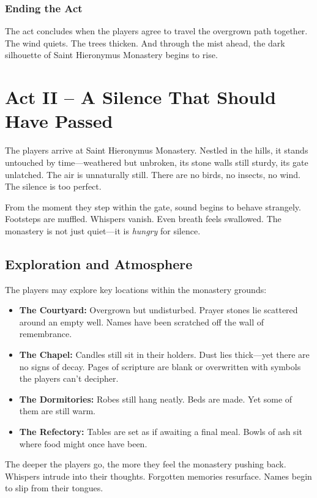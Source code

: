 \documentclass[nodeprecatedcode,bg=print]{dndbook/dndbook}
\begin{document}
\subsubsection{Ending the Act} The act concludes when the players agree to travel the overgrown path together. The wind quiets. The trees thicken. And through the mist ahead, the dark silhouette of Saint Hieronymus Monastery begins to rise.


\section*{Act II – A Silence That Should Have Passed}

The players arrive at Saint Hieronymus Monastery. Nestled in the hills, it stands untouched by time—weathered but unbroken, its stone walls still sturdy, its gate unlatched. The air is unnaturally still. There are no birds, no insects, no wind. The silence is too perfect.

From the moment they step within the gate, sound begins to behave strangely. Footsteps are muffled. Whispers vanish. Even breath feels swallowed. The monastery is not just quiet—it is \emph{hungry} for silence.


\subsection{Exploration and Atmosphere}

The players may explore key locations within the monastery grounds:
\begin{itemize}
    \item \textbf{The Courtyard:} Overgrown but undisturbed. Prayer stones lie scattered around an empty well. Names have been scratched off the wall of remembrance.
    \item \textbf{The Chapel:} Candles still sit in their holders. Dust lies thick—yet there are no signs of decay. Pages of scripture are blank or overwritten with symbols the players can’t decipher.
    \item \textbf{The Dormitories:} Robes still hang neatly. Beds are made. Yet some of them are still warm.
    \item \textbf{The Refectory:} Tables are set as if awaiting a final meal. Bowls of ash sit where food might once have been.
\end{itemize}

The deeper the players go, the more they feel the monastery pushing back. Whispers intrude into their thoughts. Forgotten memories resurface. Names begin to slip from their tongues.
\end{document}
